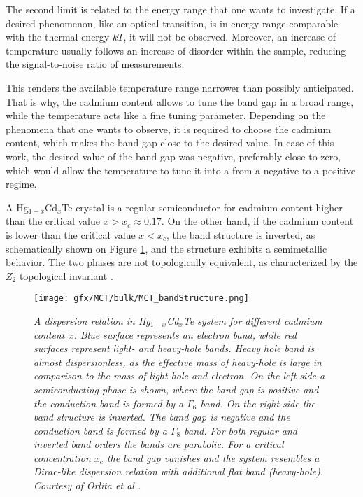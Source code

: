 \documentclass[titlepage,a4paper]{book}
\begin{document}
The second limit is related to the energy range that one wants to investigate. If a desired phenomenon, like an optical transition, is in energy range comparable with the thermal energy $kT$, it will not be observed. Moreover, an increase of temperature usually follows an increase of disorder within the sample, reducing the signal-to-noise ratio of measurements.

This renders the available temperature range narrower than possibly anticipated. That is why, the cadmium content allows to tune the band gap in a broad range, while the temperature acts like a fine tuning parameter. Depending on the phenomena that one wants to observe, it is required to choose the cadmium content, which makes the band gap close to the desired value. In case of this work, the desired value of the band gap was negative, preferably close to zero, which would allow the temperature to tune it into a from a negative to a positive regime. 

A Hg$_{1-x}$Cd$_x$Te crystal is a regular semiconductor for cadmium content higher than the critical value $x > x_c \approx 0.17$. On the other hand, if the cadmium content is lower than the critical value $x < x_c$, the band structure is inverted, as schematically shown on Figure \ref{fig:MCT_bandStructure}, and the structure exhibits a semimetallic behavior. The two phases are not topologically equivalent, as characterized by the $Z_2$ topological invariant \cite{Bernevig_Topology2}.

\begin{figure}[ht]
	\centering
	\texttt{[image: gfx/MCT/bulk/MCT\_bandStructure.png]}
	\vspace{-10pt}
	\caption{\textit{A dispersion relation in Hg$_{1-x}$Cd$_x$Te system for different cadmium content $x$. Blue surface represents an electron band, while red surfaces represent light- and heavy-hole bands. Heavy hole band is almost dispersionless, as the effective mass of heavy-hole is large in comparison to the mass of light-hole and electron. On the left side a semiconducting phase is shown, where the band gap is positive and the conduction band is formed by a $\Gamma_6$ band. On the right side the band structure is inverted. The band gap is negative and the conduction band is formed by a $\Gamma_8$ band. For both regular and inverted band orders the bands are parabolic. For a critical concentration $x_c$ the band gap vanishes and the system resembles a Dirac-like dispersion relation with additional flat band (heavy-hole). Courtesy of Orlita et al \cite{Orlita_MCT}.}}
	\label{fig:MCT_bandStructure}
\end{figure} 
\end{document}
